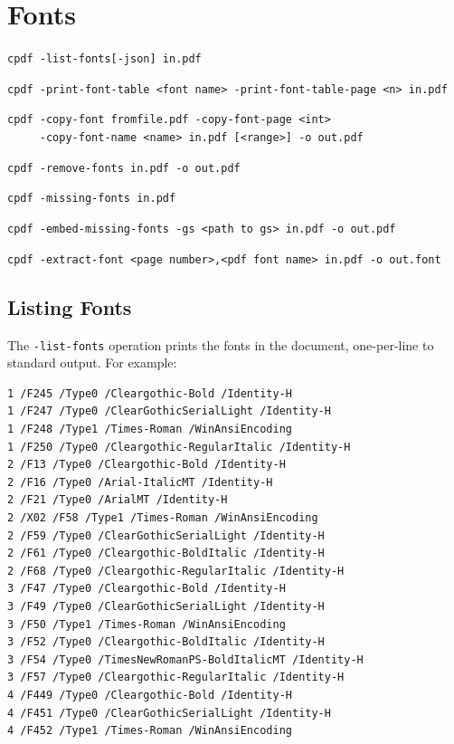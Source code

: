 \documentclass{book}
\begin{document}
\chapter{Fonts}\pagestyle{fancy}\label{chap:14}
 {\small \begin{framed}

  \small\noindent\verb!cpdf -list-fonts[-json] in.pdf!

  \vspace{1.5mm}
  \noindent\verb!cpdf -print-font-table <font name> -print-font-table-page <n> in.pdf!
  
  \vspace{1.5mm}
  \noindent\verb!cpdf -copy-font fromfile.pdf -copy-font-page <int>!\\
  \noindent\verb!     -copy-font-name <name> in.pdf [<range>] -o out.pdf!

  \vspace{1.5mm}
  \noindent\verb!cpdf -remove-fonts in.pdf -o out.pdf!

  \vspace{1.5mm}
  \noindent\verb!cpdf -missing-fonts in.pdf!

  \vspace{1.5mm}
  \noindent\verb!cpdf -embed-missing-fonts -gs <path to gs> in.pdf -o out.pdf!

  \vspace{1.5mm}
  \noindent\verb!cpdf -extract-font <page number>,<pdf font name> in.pdf -o out.font!

  \end{framed}}
 
\section{Listing Fonts}

\label{listingfonts}
  The \texttt{-list-fonts} operation prints the fonts in the document,
one-per-line to standard output. For example:
{\small\begin{framed}\small\begin{verbatim}
1 /F245 /Type0 /Cleargothic-Bold /Identity-H
1 /F247 /Type0 /ClearGothicSerialLight /Identity-H
1 /F248 /Type1 /Times-Roman /WinAnsiEncoding
1 /F250 /Type0 /Cleargothic-RegularItalic /Identity-H
2 /F13 /Type0 /Cleargothic-Bold /Identity-H
2 /F16 /Type0 /Arial-ItalicMT /Identity-H
2 /F21 /Type0 /ArialMT /Identity-H
2 /X02 /F58 /Type1 /Times-Roman /WinAnsiEncoding
2 /F59 /Type0 /ClearGothicSerialLight /Identity-H
2 /F61 /Type0 /Cleargothic-BoldItalic /Identity-H
2 /F68 /Type0 /Cleargothic-RegularItalic /Identity-H
3 /F47 /Type0 /Cleargothic-Bold /Identity-H
3 /F49 /Type0 /ClearGothicSerialLight /Identity-H
3 /F50 /Type1 /Times-Roman /WinAnsiEncoding
3 /F52 /Type0 /Cleargothic-BoldItalic /Identity-H
3 /F54 /Type0 /TimesNewRomanPS-BoldItalicMT /Identity-H
3 /F57 /Type0 /Cleargothic-RegularItalic /Identity-H
4 /F449 /Type0 /Cleargothic-Bold /Identity-H
4 /F451 /Type0 /ClearGothicSerialLight /Identity-H
4 /F452 /Type1 /Times-Roman /WinAnsiEncoding
\end{verbatim}
\end{framed}}
\end{document}
